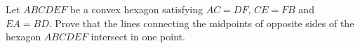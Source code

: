 Let $ABCDEF$ be a convex hexagon satisfying $AC=DF$, $CE=FB$ and $EA=BD$. Prove that the lines connecting the midpoints of opposite sides of the hexagon $ABCDEF$ intersect in one point.